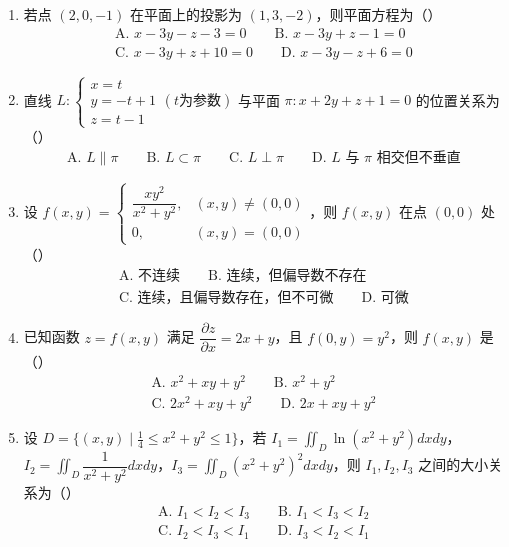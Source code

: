 \documentclass[12pt,a4paper]{article}
\begin{document}
\begin{enumerate}[label=\arabic*、, itemsep=1.5em]
    \item 若点 \((2,0,-1)\) 在平面上的投影为 \((1,3,-2)\)，则平面方程为（\hspace{1cm}）
    \begin{gather*}
        \text{A. } x - 3y - z - 3 = 0 \qquad \text{B. } x - 3y + z - 1 = 0 \\
        \text{C. } x - 3y + z + 10 = 0 \qquad \text{D. } x - 3y - z + 6 = 0
    \end{gather*}

    \item 直线 \(L:\begin{cases} x = t \\ y = -t + 1 \\ z = t - 1 \end{cases} (t \text{为参数})\) 与平面 \(\pi: x + 2y + z + 1 = 0\) 的位置关系为（\hspace{1cm}）
    \begin{gather*}
        \text{A. } L \parallel \pi \qquad \text{B. } L \subset \pi \qquad \text{C. } L \perp \pi \qquad \text{D. } L \text{ 与 } \pi \text{ 相交但不垂直}
    \end{gather*}

    \item 设 \(f(x,y) = \begin{cases} \dfrac{xy^2}{x^2 + y^2}, & (x,y) \neq (0,0) \\ 0, & (x,y) = (0,0) \end{cases}\)，则 \(f(x,y)\) 在点 \((0,0)\) 处（\hspace{1cm}）
    \begin{gather*}
        \text{A. 不连续} \qquad \text{B. 连续，但偏导数不存在} \\
        \text{C. 连续，且偏导数存在，但不可微} \qquad \text{D. 可微}
    \end{gather*}

    \item 已知函数 \(z = f(x,y)\) 满足 \(\dfrac{\partial z}{\partial x} = 2x + y\)，且 \(f(0,y) = y^{2}\)，则 \(f(x,y)\) 是（\hspace{1cm}）
    \begin{gather*}
        \text{A. } x^{2} + xy + y^{2} \qquad \text{B. } x^{2} + y^{2} \\
        \text{C. } 2x^{2} + xy + y^{2} \qquad \text{D. } 2x + xy + y^{2}
    \end{gather*}

    \item 设 \(D = \{(x,y) \mid \frac{1}{4} \leq x^{2} + y^{2} \leq 1\}\)，若 \(I_{1} = \iint_{D}\ln(x^{2} + y^{2})dxdy\)，\(I_{2} = \iint_{D}\dfrac{1}{x^{2} + y^{2}} dxdy\)，\(I_{3} = \iint_{D}(x^{2} + y^{2})^{2}dxdy\)，则 \(I_{1},I_{2},I_{3}\) 之间的大小关系为（\hspace{1cm}）
    \begin{gather*}
        \text{A. } I_{1} < I_{2} < I_{3} \qquad \text{B. } I_{1} < I_{3} < I_{2} \\
        \text{C. } I_{2} < I_{3} < I_{1} \qquad \text{D. } I_{3} < I_{2} < I_{1}
    \end{gather*}


\end{enumerate}
\end{document}
